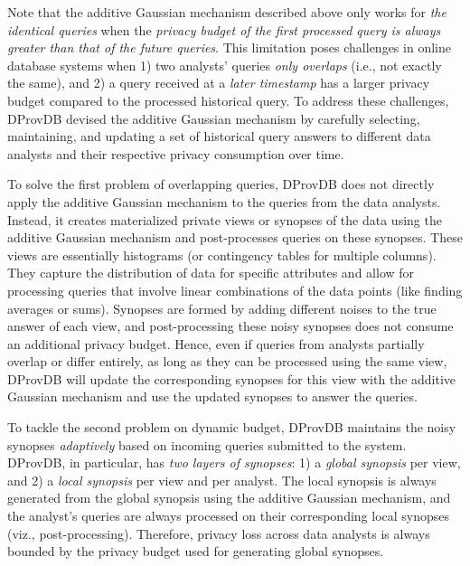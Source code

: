 Note that the additive Gaussian mechanism described above only works for \textit{the identical queries} when the \textit{privacy budget of the first processed query is always greater than that of the future queries}. 
This limitation poses challenges in online database systems when 1) two analysts' queries \textit{only overlaps} (i.e., not exactly the same), and 2) a query received at a \textit{later timestamp} has a larger privacy budget compared to the processed historical query. To address these challenges, DProvDB devised the additive Gaussian mechanism by carefully selecting, maintaining, and updating a set of historical query answers to different data analysts and their respective privacy consumption over time.  


To solve the first problem of overlapping queries, DProvDB does not directly apply the additive Gaussian mechanism to the queries from the data analysts. Instead, it creates materialized private views or synopses of the data using the additive Gaussian mechanism and post-processes queries on these synopses. 
These views are essentially histograms (or contingency tables for multiple columns). They capture the distribution of data for specific attributes and allow for processing queries that involve linear combinations of the data points (like finding averages or sums). Synopses are formed by adding different noises to the true answer of each view, and post-processing these noisy synopses does not consume an additional privacy budget. Hence, even if queries from analysts partially overlap or differ entirely, as long as they can be processed using the same view, DProvDB will update the corresponding synopses for this view with the additive Gaussian mechanism and use the updated synopses to answer the queries. 


To tackle the second problem on dynamic budget, DProvDB maintains the noisy synopses \textit{adaptively} based on incoming queries submitted to the system.
DProvDB, in particular, has \textit{two layers of synopses}: 1) a \textit{global synopsis} per view, and 2) a \textit{local synopsis} per view and per analyst.
The local synopsis is always generated from the global synopsis using the additive Gaussian mechanism, and the analyst's queries are always processed on their corresponding local synopses (viz., post-processing).
Therefore, privacy loss across data analysts is always bounded by the privacy budget used for generating global synopses.

